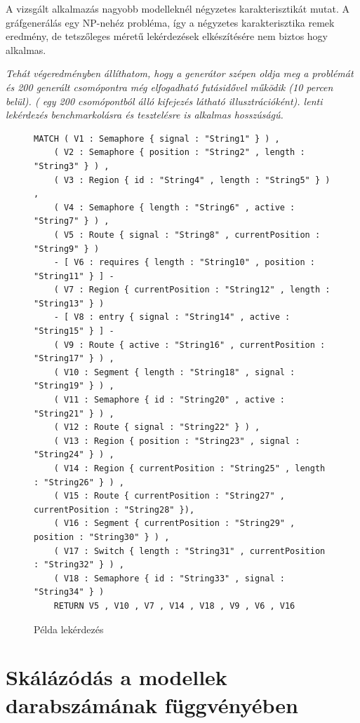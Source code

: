 A vizsgált alkalmazás nagyobb modelleknél négyzetes karakterisztikát mutat. A gráfgenerálás egy NP-nehéz probléma, így a négyzetes karakterisztika remek eredmény, de tetszőleges méretű lekérdezések elkészítésére nem biztos hogy alkalmas.

\textit{Tehát végeredményben állíthatom, hogy a generátor szépen oldja meg a problémát és 200 generált csomópontra még elfogadható futásidővel működik (10 percen belül). ( egy 200 csomópontból álló kifejezés látható illusztrációként).  lenti lekérdezés benchmarkolásra és tesztelésre is alkalmas hosszúságú.}

\begin{figure}[htp]
	\centering
	\begin{lstlisting}[style=cyphersmall]
	MATCH ( V1 : Semaphore { signal : "String1" } ) ,
	( V2 : Semaphore { position : "String2" , length : "String3" } ) ,
	( V3 : Region { id : "String4" , length : "String5" } ) ,
	( V4 : Semaphore { length : "String6" , active : "String7" } ) ,
	( V5 : Route { signal : "String8" , currentPosition : "String9" } )
	- [ V6 : requires { length : "String10" , position : "String11" } ] - 
	( V7 : Region { currentPosition : "String12" , length : "String13" } )
	- [ V8 : entry { signal : "String14" , active : "String15" } ] -
	( V9 : Route { active : "String16" , currentPosition : "String17" } ) ,
	( V10 : Segment { length : "String18" , signal : "String19" } ) ,
	( V11 : Semaphore { id : "String20" , active : "String21" } ) ,
	( V12 : Route { signal : "String22" } ) ,
	( V13 : Region { position : "String23" , signal : "String24" } ) ,
	( V14 : Region { currentPosition : "String25" , length : "String26" } ) ,
	( V15 : Route { currentPosition : "String27" , currentPosition : "String28" }),
	( V16 : Segment { currentPosition : "String29" , position : "String30" } ) ,
	( V17 : Switch { length : "String31" , currentPosition : "String32" } ) ,
	( V18 : Semaphore { id : "String33" , signal : "String34" } )
	RETURN V5 , V10 , V7 , V14 , V18 , V9 , V6 , V16
	\end{lstlisting}
	\caption{Példa lekérdezés}
	\label{fig:examplequery}
\end{figure}

\section{Skálázódás a modellek darabszámának függvényében}
 

